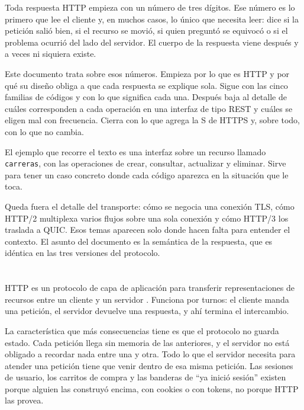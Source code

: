 \documentclass[10pt,a4paper]{article}
\begin{document}
Toda respuesta HTTP empieza con un número de tres dígitos. Ese número es lo primero que lee el cliente y, en muchos casos, lo único que necesita leer: dice si la petición salió bien, si el recurso se movió, si quien preguntó se equivocó o si el problema ocurrió del lado del servidor. El cuerpo de la respuesta viene después y a veces ni siquiera existe.

Este documento trata sobre esos números. Empieza por lo que es HTTP y por qué su diseño obliga a que cada respuesta se explique sola. Sigue con las cinco familias de códigos y con lo que significa cada una. Después baja al detalle de cuáles corresponden a cada operación en una interfaz de tipo REST y cuáles se eligen mal con frecuencia. Cierra con lo que agrega la S de HTTPS y, sobre todo, con lo que no cambia.

El ejemplo que recorre el texto es una interfaz sobre un recurso llamado \texttt{carreras}, con las operaciones de crear, consultar, actualizar y eliminar. Sirve para tener un caso concreto donde cada código aparezca en la situación que le toca.

Queda fuera el detalle del transporte: cómo se negocia una conexión TLS, cómo HTTP/2 multiplexa varios flujos sobre una sola conexión y cómo HTTP/3 los traslada a QUIC. Esos temas aparecen solo donde hacen falta para entender el contexto. El asunto del documento es la semántica de la respuesta, que es idéntica en las tres versiones del protocolo.

\section{\color{colorIPN}{Qué es HTTP}}

HTTP es un protocolo de capa de aplicación para transferir representaciones de recursos entre un cliente y un servidor \cite{rfc9110}. Funciona por turnos: el cliente manda una petición, el servidor devuelve una respuesta, y ahí termina el intercambio.

La característica que más consecuencias tiene es que el protocolo no guarda estado. Cada petición llega sin memoria de las anteriores, y el servidor no está obligado a recordar nada entre una y otra. Todo lo que el servidor necesita para atender una petición tiene que venir dentro de esa misma petición. Las sesiones de usuario, los carritos de compra y las banderas de \enquote{ya inició sesión} existen porque alguien las construyó encima, con cookies o con tokens, no porque HTTP las provea.
\end{document}
